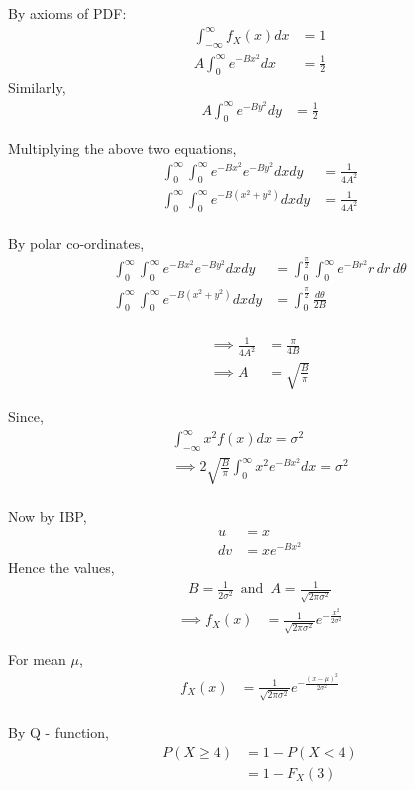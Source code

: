 \documentclass[journal,12pt,twocolumn]{IEEEtran}
\theoremstyle{remark}
\begin{document}
By axioms of PDF:
\begin{align}
\int_{-\infty}^{\infty} f_X(x)dx &= 1\\
A \int_0^{\infty} e^{-Bx^2}dx &= \frac{1}{2}
\end{align}
Similarly,
\begin{align}
A \int_0^{\infty} e^{-By^2}dy &= \frac{1}{2}
\end{align}

Multiplying the above two equations,
\begin{align}
\int_0^{\infty}\int_0^{\infty} e^{-Bx^2}e^{-By^2}dxdy &= \frac{1}{4A^2}\\
\int_0^{\infty}\int_0^{\infty} e^{-B(x^2+y^2)}dxdy &= \frac{1}{4A^2}
\end{align}
\\
By polar co-ordinates,
\begin{align}
\int_0^{\infty}\int_0^{\infty} e^{-Bx^2}e^{-By^2}dxdy &= \int_0^{\frac{\pi}{2}}\int_0^{\infty} e^{-Br^2} r \, dr \, d\theta\\
\int_0^{\infty}\int_0^{\infty} e^{-B(x^2+y^2)}dxdy &= \int_0^{\frac{\pi}{2}} \frac{d\theta}{2B}
\end{align}
\\
\begin{align}
\implies
	\frac{1}{4A^2}	&= \frac{\pi}{4B}\\
\implies 
	A &= \sqrt{\frac{B}{\pi}}
\end{align}

Since,
\begin{align}
\int_{-\infty}^{\infty} x^2 f(x)dx = \sigma^2\\
\implies
2 \sqrt{\frac{B}{\pi}}\int_{0}^{\infty} x^2 e^{-Bx^2}dx = \sigma^2
\end{align}
\\
Now by IBP,
\begin{align}
u &= x\\ dv &= x e^{-Bx^2}
\end{align}
Hence the values,
\begin{align}
B = \frac{1}{2\sigma^2} \, \text{ and } \, A = \frac{1}{\sqrt{2\pi\sigma^2}}
\end{align}
\begin{align}
\implies f_X(x) &= \frac{1}{\sqrt{2\pi\sigma^2}} e^{-\frac{x^2}{2\sigma^2}}
\end{align}

For mean $\mu$,
\begin{align}
f_X(x) &= \frac{1}{\sqrt{2\pi\sigma^2}} e^{-\frac{(x-\mu)^2}{2\sigma^2}}
\end{align}
\\
By Q - function,
\begin{align}
P(X \geq 4) &= 1 - P(X < 4)\\
	    &= 1 - F_X(3)
\end{align}
\end{document}
